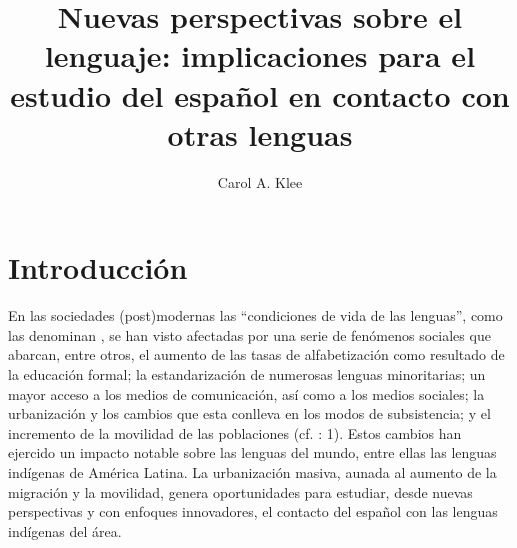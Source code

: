 \documentclass[output=paper]{langscibook}
\author{Carol A. Klee\orcid{0000-0002-8191-6293}\affiliation{University of Minnesota}}
\title{Nuevas perspectivas sobre el lenguaje: implicaciones para el estudio del español en contacto con otras lenguas}
\begin{document}
\maketitle 
{}




\section{Introducción}


En las sociedades (post)modernas las “condiciones de vida de las lenguas”, como las denominan   \citet{ToivanenSaarikivi2016}, se han visto afectadas por una serie de fenómenos sociales que abarcan, entre otros, el aumento de las tasas de alfabetización como resultado de la educación formal; la estandarización de numerosas lenguas minoritarias; un mayor acceso a los medios de comunicación, así como a los medios sociales; la urbanización y los cambios que esta conlleva en los modos de subsistencia; y el incremento de la movilidad de las poblaciones (cf. \citealt{ToivanenSaarikivi2016}: 1). Estos cambios han ejercido un impacto notable sobre las lenguas del mundo, entre ellas las lenguas indígenas de América Latina. La urbanización masiva, aunada al aumento de la migración y la movilidad, genera oportunidades para estudiar, desde nuevas perspectivas y con enfoques innovadores, el contacto del español con las lenguas indígenas del área.
\end{document}
